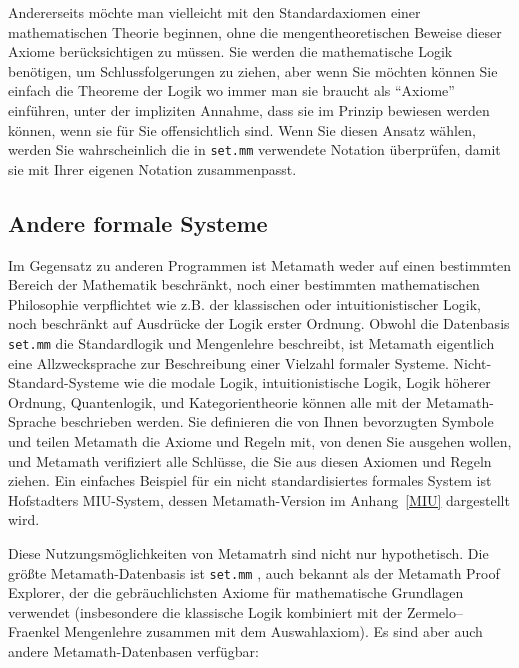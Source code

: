 Andererseits möchte man vielleicht mit den Standardaxiomen einer mathematischen Theorie beginnen, ohne die mengentheoretischen Beweise dieser Axiome berücksichtigen zu müssen.  Sie werden die mathematische Logik benötigen, um Schlussfolgerungen zu ziehen, aber wenn Sie möchten können Sie einfach die Theoreme der Logik wo immer man sie braucht als "`Axiome"' einführen, unter der impliziten Annahme, dass sie im Prinzip bewiesen werden können, wenn sie für Sie offensichtlich sind.  Wenn Sie diesen Ansatz wählen, werden Sie wahrscheinlich die in
\texttt{set.mm} verwendete Notation überprüfen, damit sie mit Ihrer eigenen Notation zusammenpasst.

\subsection{Andere formale Systeme}

Im Gegensatz zu anderen Programmen ist Metamath weder auf einen bestimmten Bereich der Mathematik beschränkt, noch einer bestimmten mathematischen Philosophie verpflichtet wie z.B. der klassischen oder intuitionistischer Logik, noch beschränkt auf Ausdrücke der Logik erster Ordnung.  Obwohl die Datenbasis \texttt{set.mm} die Standardlogik und Mengenlehre beschreibt, ist Metamath eigentlich eine Allzwecksprache zur Beschreibung einer Vielzahl formaler Systeme.  Nicht-Standard-Systeme wie die modale Logik, intuitionistische Logik, Logik höherer Ordnung, Quantenlogik, und Kategorientheorie können alle mit der Metamath-Sprache beschrieben werden.  Sie definieren die von Ihnen bevorzugten Symbole und teilen Metamath die Axiome und Regeln mit, von denen Sie ausgehen wollen, und Metamath verifiziert alle Schlüsse, die Sie aus diesen Axiomen und Regeln ziehen.
Ein einfaches Beispiel für ein nicht standardisiertes formales System ist Hofstadters MIU-System, dessen Metamath-Version im Anhang~\ref{MIU} dargestellt wird.

Diese Nutzungsmöglichkeiten von Metamatrh sind nicht nur hypothetisch.
Die größte Metamath-Datenbasis ist
\texttt{set.mm}%
, auch bekannt als der Metamath Proof Explorer, der die gebräuchlichsten Axiome für mathematische Grundlagen verwendet
(insbesondere die klassische Logik kombiniert mit der Zermelo--Fraenkel
Mengenlehre zusammen mit dem Auswahlaxiom).
Es sind aber auch andere Metamath-Datenbasen verfügbar:

